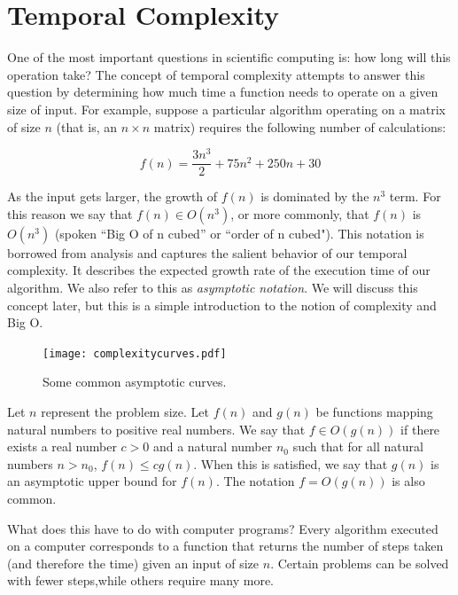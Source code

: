 

\section*{Temporal Complexity}
One of the most important questions in scientific computing is: how long will this operation take?
The concept of temporal complexity attempts to answer this question by determining how much time a function needs to operate on a given size of input. 
For example, suppose a particular algorithm operating on a matrix of size $n$ (that is, an $n \times n$ matrix) requires the following number of calculations:

\begin{equation*}
f(n) = \frac{3n^3}{2} + 75n^2 + 250n + 30
\end{equation*}

As the input gets larger, the growth of $f(n)$ is dominated by the $n^3$ term.
For this reason we say that $f(n) \in O(n^3)$, or more commonly, that $f(n)$ is $O(n^3)$ (spoken ``Big O of n cubed'' or ``order of n cubed").
This notation is borrowed from analysis and captures the salient behavior of our temporal complexity. It describes the expected growth rate of the execution time of our algorithm. We also refer to this as \emph{asymptotic notation}.
We will discuss this concept later, but this is a simple introduction to the notion of complexity and Big O.

\begin{figure}
\centering
\texttt{[image: complexitycurves.pdf]}
\caption{Some common asymptotic curves.}
\end{figure}

\begin{definition}
Let $n$ represent the problem size.  Let $f(n)$ and $g(n)$ be functions mapping natural numbers to positive real numbers. We say that $f \in O(g(n))$ if there exists a real number $c > 0$ and a natural number $n_0$ such that for all natural numbers $n > n_0$, $f(n) \leq cg(n)$.
When this is satisfied, we say that $g(n)$ is an asymptotic upper bound for $f(n)$. 
The notation $f = O(g(n))$ is also common.
\end{definition}

What does this have to do with computer programs?
Every algorithm executed on a computer corresponds to a function
that returns the number of steps taken (and therefore the time)
given an input of size $n$.  Certain problems can be solved with fewer steps,while others require many more.  

